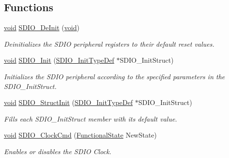\subsection*{Functions}
\begin{DoxyCompactItemize}
\item 
\hyperlink{usb__devapi_8h_afabf60e7f57651d6d595a02c75f07cd0}{void} \hyperlink{group___s_d_i_o___private___functions_gac359d2c6c67a2590f8f9b720c0e4ff1b}{S\+D\+I\+O\+\_\+\+De\+Init} (\hyperlink{usb__devapi_8h_afabf60e7f57651d6d595a02c75f07cd0}{void})
\begin{DoxyCompactList}\small\item\em Deinitializes the S\+D\+IO peripheral registers to their default reset values. \end{DoxyCompactList}\item 
\hyperlink{usb__devapi_8h_afabf60e7f57651d6d595a02c75f07cd0}{void} \hyperlink{group___s_d_i_o___private___functions_gad40764a8e37c0ed5c9141ae338ff0203}{S\+D\+I\+O\+\_\+\+Init} (\hyperlink{struct_s_d_i_o___init_type_def}{S\+D\+I\+O\+\_\+\+Init\+Type\+Def} $\ast$S\+D\+I\+O\+\_\+\+Init\+Struct)
\begin{DoxyCompactList}\small\item\em Initializes the S\+D\+IO peripheral according to the specified parameters in the S\+D\+I\+O\+\_\+\+Init\+Struct. \end{DoxyCompactList}\item 
\hyperlink{usb__devapi_8h_afabf60e7f57651d6d595a02c75f07cd0}{void} \hyperlink{group___s_d_i_o___private___functions_ga778d338c29df4fae9ef69432e6df32ad}{S\+D\+I\+O\+\_\+\+Struct\+Init} (\hyperlink{struct_s_d_i_o___init_type_def}{S\+D\+I\+O\+\_\+\+Init\+Type\+Def} $\ast$S\+D\+I\+O\+\_\+\+Init\+Struct)
\begin{DoxyCompactList}\small\item\em Fills each S\+D\+I\+O\+\_\+\+Init\+Struct member with its default value. \end{DoxyCompactList}\item 
\hyperlink{usb__devapi_8h_afabf60e7f57651d6d595a02c75f07cd0}{void} \hyperlink{group___s_d_i_o___private___functions_ga7243b857d6b323748ff3a493b265bedc}{S\+D\+I\+O\+\_\+\+Clock\+Cmd} (\hyperlink{agilefox_2library_2inc_2stm32f10x__type_8h_ac9a7e9a35d2513ec15c3b537aaa4fba1}{Functional\+State} New\+State)
\begin{DoxyCompactList}\small\item\em Enables or disables the S\+D\+IO Clock. \end{DoxyCompactList}\item 

\end{DoxyCompactItemize}
